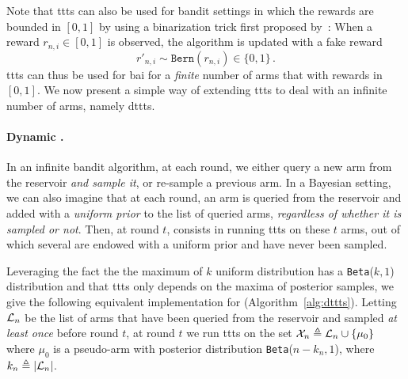 Note that \gls{ttts} can also be used for bandit settings in which the rewards are bounded in $[0,1]$ by using a binarization trick first proposed by~\cite{agrawal2012analysis}: When a reward $r_{n,i} \in [0,1]$ is observed, the algorithm is updated with a fake reward  
\[
    r'_{n,i} \sim \texttt{Bern}(r_{n,i}) \in \{0,1\}\,.
\]
\gls{ttts} can thus be used for \gls{bai} for a \emph{finite} number of arms that with rewards in $[0,1]$. We now present a simple way of extending \gls{ttts}{} to deal with an infinite number of arms, namely \gls{dttts}.

\paragraph{Dynamic \TTTS{}.}


In an infinite bandit algorithm, at each round, we either query a new arm from the reservoir \emph{and sample it}, or re-sample a previous arm. In a Bayesian setting, we can also imagine that at each round, an arm is queried from the reservoir and added with a \textit{uniform prior} to the list of queried arms, \emph{regardless of whether it is sampled or not}. Then, at round $t$, \DTTTS consists in running \gls{ttts} on these $t$ arms, out of which several are endowed with a uniform prior and have never been sampled. 

Leveraging the fact the the maximum of $k$ uniform distribution has a \texttt{Beta}($k,1$) distribution and that \gls{ttts} only depends on the maxima of posterior samples, we give the following equivalent implementation for \DTTTS (Algorithm~\ref{alg:dttts}). Letting $\mathcal{L}_n$ be the list of arms that have been queried  from the reservoir and sampled \textit{at least once} before round $t$, at round $t$ we run \gls{ttts} on the set $\mathcal{X}_n \triangleq \mathcal{L}_n \cup \{\mu_0\}$ where $\mu_0$ is a pseudo-arm with posterior distribution \texttt{Beta}($n-k_n, 1$), where $k_n\triangleq|\mathcal{L}_n|$.  

